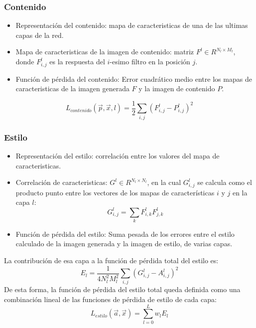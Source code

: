 \documentclass[12pt,center]{beamer}
\begin{document}
\begin{frame}
 \frametitle{Contenido}
  \begin{itemize}
   \item Representación del contenido: mapa de caracteristicas de una de las ultimas capas de la red.
   \item Mapa de caracteristicas de la imagen de contenido: matriz $F^l \in R^{N_l \times M_l}$, donde $F_{i,j}^l$ es la respuesta del $i$-esimo filtro en la posición $j$.
   \item Función de pérdida del contenido: Error cuadrático medio entre los mapas de caracteristicas de la imagen generada $F$ y la imagen de contenido $P$.
  \end{itemize}
  \begin{equation}
    L_{contenido}(\overrightarrow{p},\overrightarrow{x}, l) = \frac{1}{2} \sum_{i,j} (F_{i,j}^l - P_{i,j}^l)^2
  \end{equation}
\end{frame}

\begin{frame}
 \frametitle{Estilo}
  \begin{itemize}
    \item Representación del estilo: correlación entre los valores del mapa de caracteristicas.
    \item Correlación de caracteristicas: $G^l \in R^{N_l \times N_l}$, en la cual $G_{i,j}^l$ se calcula como el producto punto entre los vectores
      de los mapas de características $i$ y $j$ en la capa $l$:
	\begin{equation}
	  G_{i,j}^l = \sum_{k} F_{i,k}^l F_{j,k}^l
	\end{equation}
    \item Función de pérdida del estilo: Suma pesada de los errores entre el estilo calculado de la imagen generada y la imagen de estilo, de varias capas.
  \end{itemize}
  La contribución de esa capa a la función de pérdida total del estilo es:
      \begin{equation}
       E_l = \frac{1}{4 N_l^2 M_l^2} \sum_{i,j} (G_{i,j}^l - A_{i,j}^l)^2
      \end{equation}
      De esta forma, la función de pérdida del estilo total queda definida como una combinación lineal de las funciones de pérdida de estilo de cada capa:
      \begin{equation}
       L_{estilo}(\overrightarrow{a},\overrightarrow{x}) = \sum_{l=0}^{L} w_l E_l
      \end{equation}
\end{frame}
\end{document}
